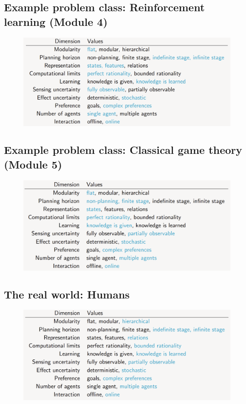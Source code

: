 \documentclass[12pt]{article}
\begin{document}
\newpage 
\subsection{Example problem class: Reinforcement learning (Module 4)}

\begin{figure}[h!]
        \centering
        \includegraphics[scale=0.4]{module-4.png}
        \caption{}
        \label{fig:my_label}
\end{figure}

\subsection{Example problem class: Classical game theory (Module 5)}

\begin{figure}[h!]
        \centering
        \includegraphics[scale=0.4]{module-5.png}
        \caption{}
        \label{fig:my_label}
\end{figure}

\newpage
\subsection{The real world: Humans}

\begin{figure}[h!]
        \centering
        \includegraphics[scale=0.4]{human-dimensions.png}
        \caption{}
        \label{fig:my_label}
\end{figure}
\end{document}
